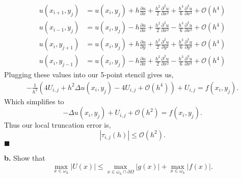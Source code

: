 \documentclass[11pt]{article}
\begin{document}
\begin{align*}
	u(x_{i+1}, y_j) &= u(x_i, y_j) + h \frac{\partial u}{\partial x} + \frac{h^2}{2} \frac{\partial^2 u}{\partial x^2} + \frac{h^3}{6} \frac{\partial^3 u}{\partial x^3} + \mathcal{O}(h^4) \\
    u(x_{i-1}, y_j) &= u(x_i, y_j) - h \frac{\partial u}{\partial x} + \frac{h^2}{2} \frac{\partial^2 u}{\partial x^2} - \frac{h^3}{6} \frac{\partial^3 u}{\partial x^3} + \mathcal{O}(h^4) \\
    u(x_i, y_{j+1}) &= u(x_i, y_j) + h \frac{\partial u}{\partial y} + \frac{h^2}{2} \frac{\partial^2 u}{\partial y^2} + \frac{h^3}{6} \frac{\partial^3 u}{\partial y^3} + \mathcal{O}(h^4) \\
    u(x_i, y_{j-1}) &= u(x_i, y_j) - h \frac{\partial u}{\partial x} + \frac{h^2}{2} \frac{\partial^2 u}{\partial x^2} - \frac{h^3}{6} \frac{\partial^3 u}{\partial x^3} + \mathcal{O}(h^4) 
\end{align*}
Plugging these values into our 5-point stencil gives us,
\begin{equation*}
\begin{split}
    -\frac{1}{h^2}(4U_{i,j} + h^2 \Delta u(x_i, y_j) - 4U_{i,j} + \mathcal{O}(h^4)) + U_{i,j} = f(x_i, y_j).
\end{split}
\end{equation*}
Which simplifies to 
\begin{equation*}
    -\Delta u(x_i, y_j) + U_{i,j} + \mathcal{O}(h^2) = f(x_i, y_j).
\end{equation*}
Thus our local truncation error is,
\begin{equation*}
    |\tau_{i,j}(h)| \leq \mathcal{O}(h^2).
\end{equation*}
$\blacksquare$



\vskip 2cm



\textbf{b.} Show that 
\begin{equation*}
    \max_{x\in \omega_h} |U(x)| \leq \max_{x \in \omega_h \cap \partial \Omega} |g(x)| + \max_{x \in \omega_h} |f(x)|.
\end{equation*}

\vskip 1cm
\end{document}
